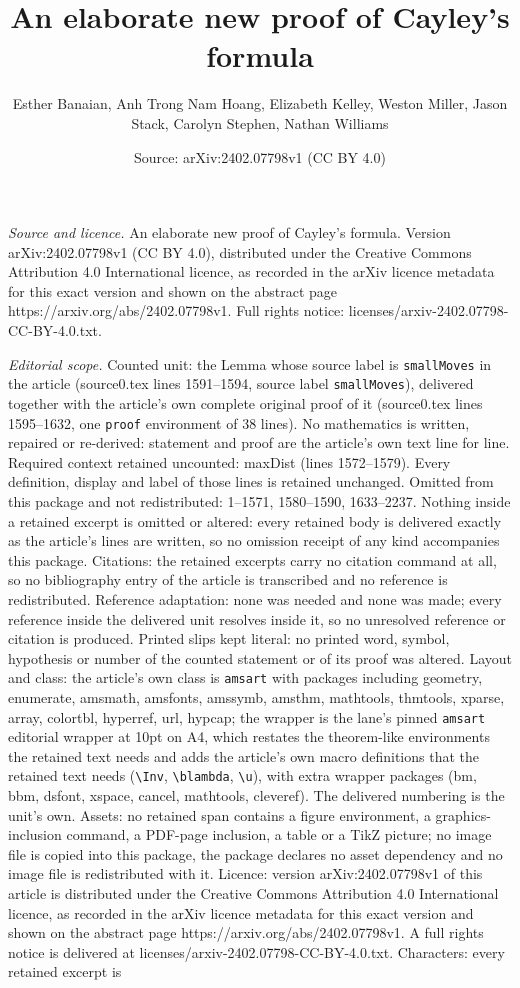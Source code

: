 \documentclass[10pt,a4paper]{amsart}
\title[An elaborate new proof of Cayley's formula]{An elaborate new proof of Cayley's formula}
\author{Esther Banaian, Anh Trong Nam Hoang, Elizabeth Kelley, Weston Miller, Jason Stack, Carolyn Stephen, Nathan Williams}
\date{Source: arXiv:2402.07798v1 (CC BY 4.0)}
\begin{document}
\maketitle

\noindent\emph{Source and licence.} An elaborate new proof of Cayley's formula. Version arXiv:2402.07798v1 (CC BY 4.0), distributed under the Creative Commons Attribution 4.0 International licence, as recorded in the arXiv licence metadata for this exact version and shown on the abstract page https://arxiv.org/abs/2402.07798v1. Full rights notice: licenses/arxiv-2402.07798-CC-BY-4.0.txt.\par\smallskip

\noindent\textit{Editorial scope.} Counted unit: the Lemma whose source label is \texttt{smallMoves} in the article (source0.tex lines 1591--1594, source label \texttt{smallMoves}), delivered together with the article's own complete original proof of it (source0.tex lines 1595--1632, one \texttt{proof} environment of 38 lines). No mathematics is written, repaired or re-derived: statement and proof are the article's own text line for line. Required context retained uncounted: maxDist (lines 1572--1579). Every definition, display and label of those lines is retained unchanged. Omitted from this package and not redistributed: 1--1571, 1580--1590, 1633--2237. Nothing inside a retained excerpt is omitted or altered: every retained body is delivered exactly as the article's lines are written, so no omission receipt of any kind accompanies this package. Citations: the retained excerpts carry no citation command at all, so no bibliography entry of the article is transcribed and no reference is redistributed. Reference adaptation: none was needed and none was made; every reference inside the delivered unit resolves inside it, so no unresolved reference or citation is produced. Printed slips kept literal: no printed word, symbol, hypothesis or number of the counted statement or of its proof was altered. Layout and class: the article's own class is \texttt{amsart} with packages including geometry, enumerate, amsmath, amsfonts, amssymb, amsthm, mathtools, thmtools, xparse, array, colortbl, hyperref, url, hypcap; the wrapper is the lane's pinned \texttt{amsart} editorial wrapper at 10pt on A4, which restates the theorem-like environments the retained text needs and adds the article's own macro definitions that the retained text needs (\texttt{\textbackslash Inv}, \texttt{\textbackslash blambda}, \texttt{\textbackslash u}), with extra wrapper packages (bm, bbm, dsfont, xspace, cancel, mathtools, cleveref). The delivered numbering is the unit's own. Assets: no retained span contains a figure environment, a graphics-inclusion command, a PDF-page inclusion, a table or a TikZ picture; no image file is copied into this package, the package declares no asset dependency and no image file is redistributed with it. Licence: version arXiv:2402.07798v1 of this article is distributed under the Creative Commons Attribution 4.0 International licence, as recorded in the arXiv licence metadata for this exact version and shown on the abstract page https://arxiv.org/abs/2402.07798v1. A full rights notice is delivered at licenses/arxiv-2402.07798-CC-BY-4.0.txt. Characters: every retained excerpt is 
\end{document}
